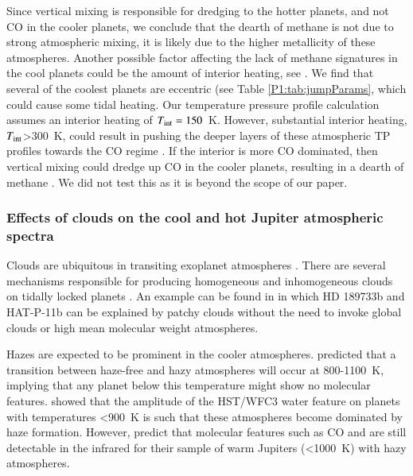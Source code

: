 Since vertical mixing is responsible for dredging  to the hotter planets, and not CO in the cooler planets, we conclude that the dearth of methane is not due to strong atmospheric mixing, it is likely due to the higher metallicity of these atmospheres. Another possible factor affecting the lack of methane signatures in the cool planets could be the amount of interior heating, see \citet[e.g.,][]{Fortney2020}. We find that several of the coolest planets are eccentric (see Table \ref{P1:tab:jumpParams}, which could cause some tidal heating. Our temperature pressure profile calculation assumes an interior heating of $T_{\rm int}= 150$~K. However, substantial interior heating, $T_{\rm int}$>300~K, could result in pushing the deeper layers of these atmospheric TP profiles towards the CO regime \citep{Morley2017, Benneke2019, Thorngren2019, Thorngren2020}. If the interior is more CO dominated, then vertical mixing could dredge up CO in the cooler planets, resulting in a dearth of methane \citep[e.g.,][]{Moses2013a}. We did not test this as it is beyond the scope of our paper.


\subsubsection{Effects of clouds on the cool and hot Jupiter atmospheric spectra}

Clouds are ubiquitous in transiting exoplanet atmospheres \citep{Sing2016}.
There are several mechanisms responsible for producing homogeneous and inhomogeneous clouds on tidally locked planets \citep{Parmentier2013, Parmentier2021, Helling2016, Helling2019a, Helling2019b}.
An example can be found in \citet{Line2016a} in which HD 189733b and HAT-P-11b can be explained by patchy clouds without the need to invoke global clouds or high mean molecular weight atmospheres.


Hazes are expected to be prominent in the cooler atmospheres. \citet{Morley2015} predicted that a transition between haze-free and hazy atmospheres will occur at 800-1100~K, implying that any planet below this temperature might show no molecular features. \citet{Gao2020} showed that the amplitude of the HST/WFC3 water feature on planets with temperatures <900~K is such that these atmospheres become dominated by haze formation. However, \citep{Kawashima2019} predict that molecular features such as CO and  are still detectable in the infrared for their sample of warm Jupiters (<1000~K) with hazy atmospheres.

